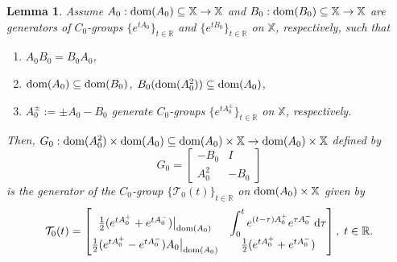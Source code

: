 \documentclass[10pt,a4paper]{amsart}
\newtheorem{lemma}{Lemma}
\newcommand\R{\mathbb R}
\newcommand{\RR}{{\mathbb R}}
\newcommand\bX{{\mathbb X}}
\newcommand\cT{{\mathcal T}}
\newcommand{\dom}{\text{\rm{dom}}}
\newcommand{\rmd}{{\mathrm{d}}}
\begin{document}
\begin{lemma}\label{l2.1}
	Assume $A_0:\dom(A_0)\subseteq\bX\to\bX$ and $B_0:\dom(B_0)\subseteq\bX\to\bX$ are generators
	of $C_0$-groups $\{e^{tA_0}\}_{t\in\R}$ and $\{e^{tB_0}\}_{t\in\R}$ on $\bX$, respectively, such that
	\begin{enumerate}
		\item[(i)] $A_0 B_0 = B_0 A_0$,
		\item[(ii)] $\dom(A_0)\subseteq\dom(B_0)$, $B_0(\dom(A_0^2))\subseteq\dom(A_0)$,
		\item[(iii)] $A_0^\pm := \pm A_0 - B_0$ generate $C_0$-groups $\{e^{tA_0^\pm}\}_{t\in\R}$ on $\bX$, respectively.
	\end{enumerate}
	Then, $G_0:\dom(A_0^2)\times\dom(A_0)\subseteq\dom(A_0)\times \bX\to\dom(A_0)\times \bX$ defined by
	\begin{equation}\label{eq:3}
		G_0 = \begin{bmatrix} -B_0 & I \\ A_0^2 & -B_0 \end{bmatrix}
	\end{equation}
	is the generator of the $C_0$-group $\{\cT_0(t)\}_{t\in\R}$ on $\dom(A_0)\times\bX$ given by
\begin{equation}\label{eq:4}
\cT_0(t) = \begin{bmatrix}
\tfrac{1}{2}(e^{tA_0^+}+e^{tA_0^-})\big|_{\dom(A_0)} &
\displaystyle\int_0^t e^{(t-\tau)A_0^+}e^{\tau A_0^-}\,\rmd\tau \\
\tfrac{1}{2}(e^{tA_0^+}-e^{tA_0^-})A_0\big|_{\dom(A_0)} &
\tfrac{1}{2}(e^{tA_0^+}+e^{tA_0^-})
\end{bmatrix},\; t\in\RR.
\end{equation}
\end{lemma} 
\end{document}
